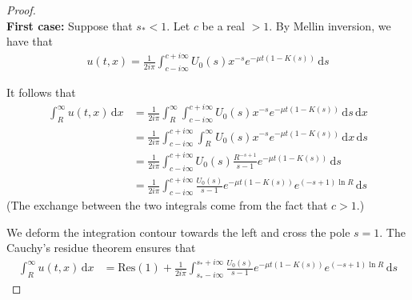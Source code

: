 \documentclass[11pt]{amsart}
\newcommand{\diff}{\,\mathrm{d}}
\begin{document}
\begin{proof}\text{}\\

\textbf{First case:} Suppose that $s_* < 1$. Let $c$ be a real $>1$. 
By Mellin inversion, we have that
\begin{align*}
    u(t,x) = \frac{1}{2i\pi}\int_{c-i\infty}^{c+i\infty} U_0(s) x^{-s} e^{-\mu t(1 - K(s))} \diff s
\end{align*}

It follows that
\begin{align*}
    \int_R^\infty u(t,x) \diff x 
    &= \frac{1}{2i\pi} \int_R^\infty \int_{c-i\infty}^{c+i\infty} U_0(s) x^{-s} e^{-\mu t(1 - K(s))} \diff s \diff x \\
    &= \frac{1}{2i\pi} \int_{c-i\infty}^{c+i\infty} \int_R^\infty U_0(s) x^{-s} e^{-\mu t(1 - K(s))} \diff x \diff s \\
    &= \frac{1}{2i\pi} \int_{c-i\infty}^{c+i\infty} U_0(s) \frac{R^{-s+1}}{s-1} e^{-\mu t(1 - K(s))} \diff s \\
    &= \frac{1}{2i\pi} \int_{c-i\infty}^{c+i\infty}\frac{U_0(s)}{s-1} e^{-\mu t(1 - K(s))} e^{(-s+1)\ln R} \diff s 
\end{align*}
(The exchange between the two integrals come from the fact that $c > 1$.)

We deform the integration contour towards the left and cross the pole $s = 1$. The Cauchy's residue theorem ensures that
\begin{align}
    \int_R^\infty u(t,x) \diff x &= \mathrm{Res(1)} + \frac{1}{2i\pi} \int_{s_*-i\infty}^{s_*+i\infty} \frac{U_0(s)}{s-1} e^{-\mu t(1 - K(s))} e^{(-s+1)\ln R} \diff s
    \label{eq:cauchy1}
\end{align}


\end{proof}
\end{document}
